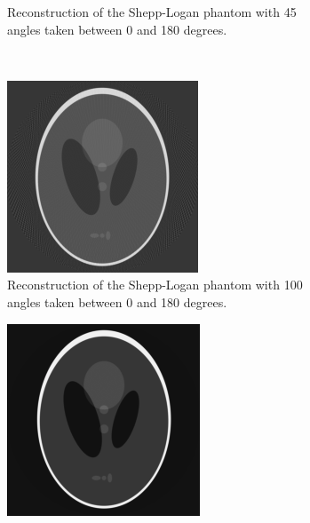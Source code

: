 \begin{figure}
\begin{subfigure}{0.48\linewidth}
		\caption{Reconstruction of the Shepp-Logan phantom with 45 angles taken between 0 and 180 degrees.}
	\end{subfigure}
	\\
	\begin{subfigure}{0.48\linewidth}
		\centering
		\includegraphics[width=\linewidth]{Materials/recon100}
		\caption{Reconstruction of the Shepp-Logan phantom with 100 angles taken between 0 and 180 degrees.}
	\end{subfigure}
	\hfill
	\begin{subfigure}{0.48\linewidth}
		\centering
		\includegraphics[width=\linewidth]{Materials/recon360}

\end{subfigure}
\end{figure}
